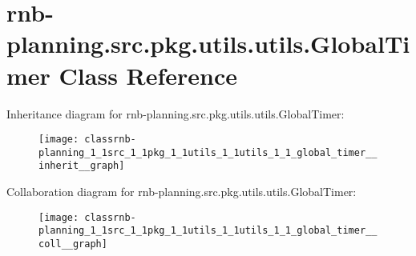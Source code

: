 \hypertarget{classrnb-planning_1_1src_1_1pkg_1_1utils_1_1utils_1_1_global_timer}{}\section{rnb-\/planning.src.\+pkg.\+utils.\+utils.\+Global\+Timer Class Reference}
\label{classrnb-planning_1_1src_1_1pkg_1_1utils_1_1utils_1_1_global_timer}


Inheritance diagram for rnb-\/planning.src.\+pkg.\+utils.\+utils.\+Global\+Timer\+:\nopagebreak
\begin{figure}[H]
\begin{center}
\leavevmode
\texttt{[image: classrnb-planning\_1\_1src\_1\_1pkg\_1\_1utils\_1\_1utils\_1\_1\_global\_timer\_\_inherit\_\_graph]}
\end{center}
\end{figure}


Collaboration diagram for rnb-\/planning.src.\+pkg.\+utils.\+utils.\+Global\+Timer\+:\nopagebreak
\begin{figure}[H]
\begin{center}
\leavevmode
\texttt{[image: classrnb-planning\_1\_1src\_1\_1pkg\_1\_1utils\_1\_1utils\_1\_1\_global\_timer\_\_coll\_\_graph]}
\end{center}
\end{figure}
